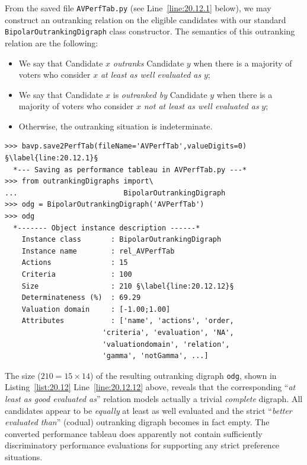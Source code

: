 From the saved file \texttt{AVPerfTab.py} (see Line~\ref{line:20.12.1} below), we may construct an outranking relation on the eligible candidates with our standard \texttt{BipolarOutran\-kingDigraph} class constructor. The semantics of this outranking relation are the following:
\begin{itemize}[nosep,leftmargin=0.5cm,rightmargin=0.5cm]
\item We say that Candidate $x$ \emph{outranks} Candidate $y$ when there is a majority of voters who consider $x$ \emph{at least as well evaluated as} $y$;
\item We say that Candidate $x$ is \emph{outranked by} Candidate $y$ when there is a majority of voters who consider $x$ \emph{not at least as well evaluated as} $y$;
\item Otherwise, the outranking situation is indeterminate.
\end{itemize}
\begin{lstlisting}[caption={Computing the outranking digraph},label=list:20.12]
>>> bavp.save2PerfTab(fileName='AVPerfTab',valueDigits=0) §\label{line:20.12.1}§
  *--- Saving as performance tableau in AVPerfTab.py ---*
>>> from outrankingDigraphs import\
...                         BipolarOutrankingDigraph
>>> odg = BipolarOutrankingDigraph('AVPerfTab')
>>> odg
  *------- Object instance description ------*
    Instance class       : BipolarOutrankingDigraph
    Instance name        : rel_AVPerfTab
    Actions              : 15
    Criteria             : 100
    Size                 : 210 §\label{line:20.12.12}§
    Determinateness (%)  : 69.29
    Valuation domain     : [-1.00;1.00]
    Attributes           : ['name', 'actions', 'order,
                       'criteria', 'evaluation', 'NA',
                       'valuationdomain', 'relation',
                       'gamma', 'notGamma', ...]
\end{lstlisting}

The size ($210 = 15 \times 14$) of the resulting outranking digraph \texttt{odg}, shown in Listing~\vref{list:20.12} Line~\ref{line:20.12.12} above, reveals that the corresponding ``\emph{at least as good evaluated as}'' relation models actually a trivial \emph{complete} digraph. All candidates appear to be \emph{equally} at least as well evaluated and the strict ``\emph{better evaluated than}'' (codual) outranking digraph becomes in fact empty. The converted performance tableau does apparently not contain sufficiently discriminatory performance evaluations for supporting any strict preference situations.

